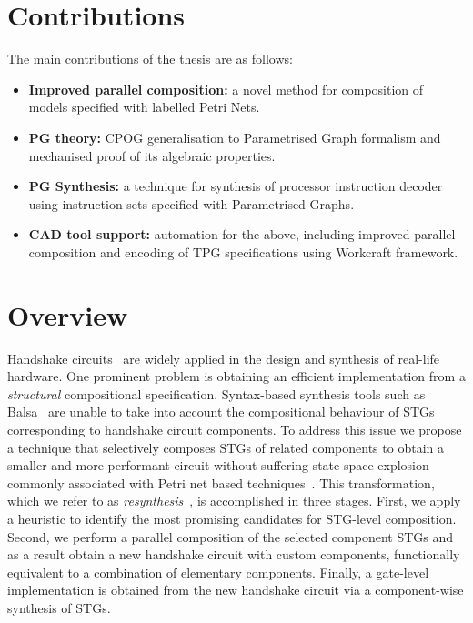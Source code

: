 \section{Contributions}

The main contributions of the thesis are as follows:

\begin{itemize}
\item
\textbf{Improved parallel composition:} a novel method for composition of models specified with labelled Petri Nets.

\item
\textbf{PG theory:} CPOG generalisation to Parametrised Graph formalism and mechanised proof of its algebraic properties.

\item
\textbf{PG Synthesis:} a technique for synthesis of processor instruction decoder using instruction sets specified with Parametrised Graphs.

\item
\textbf{CAD tool support:} automation for the above, including improved parallel composition and encoding of TPG specifications using Workcraft framework.

\end{itemize}

\section{Overview}

Handshake circuits~\cite{van2004handshake} are widely applied in the design and synthesis of real-life hardware.
One prominent problem is obtaining an efficient implementation from a \emph{structural} compositional specification.
Syntax-based synthesis tools such as Balsa~\cite{balsa} are unable to take into account the compositional
behaviour of STGs corresponding to handshake circuit components. To address this issue we propose 
a technique that selectively composes STGs of related components to obtain a smaller and more performant
circuit without suffering state space explosion commonly associated with Petri net based techniques~\cite{Valmari}.
This transformation, which we refer to as \emph{resynthesis}~\cite{ukaf_balsa_resynthesis,CN-02,KVL-96,PC-96}, is accomplished in three stages. First, we apply a heuristic to identify the most promising candidates for STG-level composition. Second, we perform a parallel composition of the selected component STGs and as a result obtain a new handshake circuit with custom components, functionally equivalent to a combination of elementary components. Finally, a gate-level implementation is obtained from the new handshake circuit via a component-wise synthesis of STGs.

